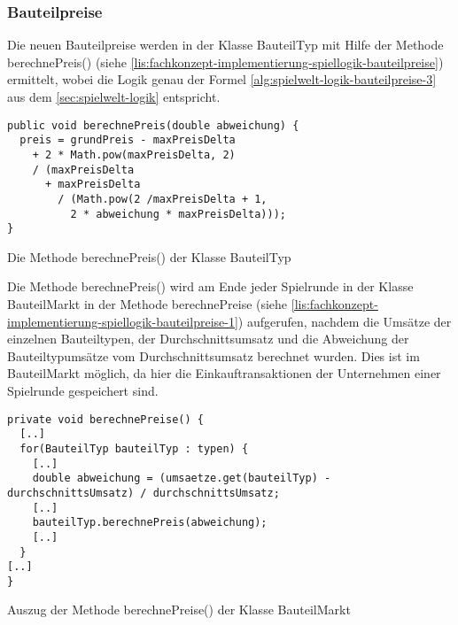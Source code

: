 \subsubsection{Bauteilpreise}
\label{subsub:fachkonzept-implementierung-spiellogik-bauteilreise}

Die neuen Bauteilpreise werden in der Klasse BauteilTyp mit Hilfe der Methode berechnePreis() (siehe \ref{lis:fachkonzept-implementierung-spiellogik-bauteilpreise}) ermittelt, wobei die Logik genau der Formel \ref{alg:spielwelt-logik-bauteilpreise-3} aus dem \ref{sec:spielwelt-logik} entspricht.

\begin{programm}[htbp]
\begin{lstlisting}[breaklines=true]
public void berechnePreis(double abweichung) {
  preis = grundPreis - maxPreisDelta
    + 2 * Math.pow(maxPreisDelta, 2)
    / (maxPreisDelta
	  + maxPreisDelta 
	    / (Math.pow(2 /maxPreisDelta + 1,
	      2 * abweichung * maxPreisDelta)));
}	
\end{lstlisting}
\caption{Die Methode berechnePreis() der Klasse BauteilTyp\label{lis:fachkonzept-implementierung-spiellogik-bauteilpreise}}
\end{programm}

Die Methode berechnePreis() wird am Ende jeder Spielrunde in der Klasse BauteilMarkt in der Methode berechnePreise (siehe \ref{lis:fachkonzept-implementierung-spiellogik-bauteilpreise-1}) aufgerufen, nachdem die Umsätze der einzelnen Bauteiltypen, der Durchschnittsumsatz und die Abweichung der Bauteiltypumsätze vom Durchschnittsumsatz berechnet wurden. Dies ist im BauteilMarkt möglich, da hier die Einkauftransaktionen der Unternehmen einer Spielrunde gespeichert sind.

\begin{programm}[htbp]
\begin{lstlisting}[breaklines=true]
private void berechnePreise() {
  [..]
  for(BauteilTyp bauteilTyp : typen) {
    [..]
    double abweichung = (umsaetze.get(bauteilTyp) - durchschnittsUmsatz) / durchschnittsUmsatz;
	[..]
	bauteilTyp.berechnePreis(abweichung);
	[..]
  }
[..]
}
\end{lstlisting}
\caption{Auszug der Methode berechnePreise() der Klasse BauteilMarkt\label{lis:fachkonzept-implementierung-spiellogik-bauteilpreise-1}}
\end{programm}
